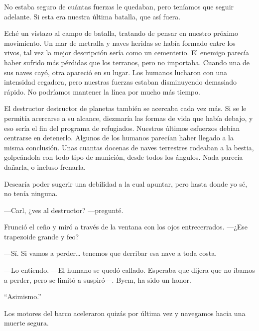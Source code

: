 No estaba seguro de cuántas fuerzas le quedaban, pero teníamos que seguir adelante. Si esta era nuestra última batalla, que así fuera.

Eché un vistazo al campo de batalla, tratando de pensar en nuestro próximo movimiento. Un mar de metralla y naves heridas se había formado entre los vivos, tal vez la mejor descripción sería como un cementerio. El enemigo parecía haber sufrido más pérdidas que los terranos, pero no importaba. Cuando una de sus naves cayó, otra apareció en su lugar. Los humanos lucharon con una intensidad cegadora, pero nuestras fuerzas estaban disminuyendo demasiado rápido. No podríamos mantener la línea por mucho más tiempo.

El destructor destructor de planetas también se acercaba cada vez más. Si se le permitía acercarse a su alcance, diezmaría las formas de vida que había debajo, y eso sería el fin del programa de refugiados. Nuestros últimos esfuerzos debían centrarse en detenerlo. Algunos de los humanos parecían haber llegado a la misma conclusión. Unas cuantas docenas de naves terrestres rodeaban a la bestia, golpeándola con todo tipo de munición, desde todos los ángulos. Nada parecía dañarla, o incluso frenarla.

Desearía poder sugerir una debilidad a la cual apuntar, pero hasta donde yo sé, no tenía ninguna.

—Carl, ¿ves al destructor? —pregunté.

Frunció el ceño y miró a través de la ventana con los ojos entrecerrados. —¿Ese trapezoide grande y feo?

—Sí. Si vamos a perder… tenemos que derribar esa nave a toda costa.

—Lo entiendo. —El humano se quedó callado. Esperaba que dijera que no íbamos a perder, pero se limitó a suspiró—. Byem, ha sido un honor.

``Asimismo.''


Los motores del barco aceleraron quizás por última vez y navegamos hacia una muerte segura.
